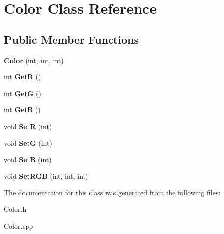 \hypertarget{classColor}{\section{Color Class Reference}
\label{classColor}
}
\subsection*{Public Member Functions}
\begin{DoxyCompactItemize}
\item 
\hypertarget{classColor_a2a0f8ff83645300ce27b8195e5ab20f9}{{\bfseries Color} (int, int, int)}\label{classColor_a2a0f8ff83645300ce27b8195e5ab20f9}

\item 
\hypertarget{classColor_a8e796fb5997990896a9af5a713e7b652}{int {\bfseries Get\+R} ()}\label{classColor_a8e796fb5997990896a9af5a713e7b652}

\item 
\hypertarget{classColor_a24ef89f897974eecd5a48af93ca54077}{int {\bfseries Get\+G} ()}\label{classColor_a24ef89f897974eecd5a48af93ca54077}

\item 
\hypertarget{classColor_a1dba8978e015475ac2967f7809e57b3b}{int {\bfseries Get\+B} ()}\label{classColor_a1dba8978e015475ac2967f7809e57b3b}

\item 
\hypertarget{classColor_abf2f2cc930b9d98b992ee13effcf5be8}{void {\bfseries Set\+R} (int)}\label{classColor_abf2f2cc930b9d98b992ee13effcf5be8}

\item 
\hypertarget{classColor_a177015e4bbe93026afa1365ba872a716}{void {\bfseries Set\+G} (int)}\label{classColor_a177015e4bbe93026afa1365ba872a716}

\item 
\hypertarget{classColor_a99839b1d46f25e7c98dd7379dd2c9787}{void {\bfseries Set\+B} (int)}\label{classColor_a99839b1d46f25e7c98dd7379dd2c9787}

\item 
\hypertarget{classColor_afb35c038283f35f38eb02e7405ab1189}{void {\bfseries Set\+R\+G\+B} (int, int, int)}\label{classColor_afb35c038283f35f38eb02e7405ab1189}

\end{DoxyCompactItemize}


The documentation for this class was generated from the following files\+:\begin{DoxyCompactItemize}
\item 
Color.\+h\item 
Color.\+cpp\end{DoxyCompactItemize}
